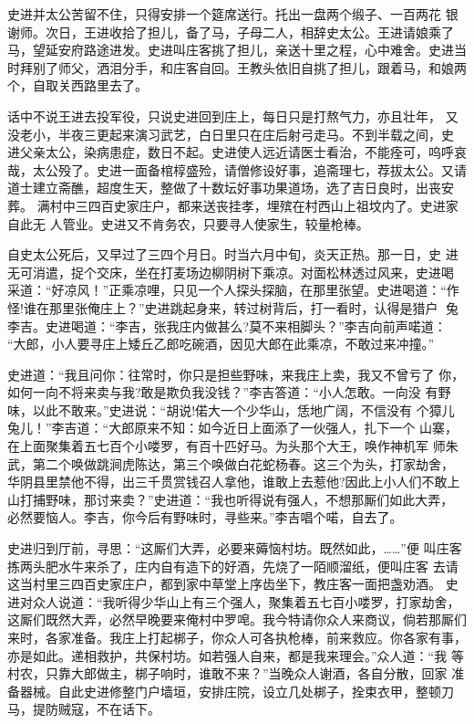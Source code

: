 史进并太公苦留不住，只得安排一个筵席送行。托出一盘两个缎子、一百两花
银谢师。次日，王进收拾了担儿，备了马，子母二人，相辞史太公。王进请娘乘了
马，望延安府路途进发。史进叫庄客挑了担儿，亲送十里之程，心中难舍。史进当
时拜别了师父，洒泪分手，和庄客自回。王教头依旧自挑了担儿，跟着马，和娘两
个，自取关西路里去了。

话中不说王进去投军役，只说史进回到庄上，每日只是打熬气力，亦且壮年，
又没老小，半夜三更起来演习武艺，白日里只在庄后射弓走马。不到半载之间，史
进父亲太公，染病患症，数日不起。史进使人远近请医士看治，不能痊可，呜呼哀
哉，太公殁了。史进一面备棺椁盛殓，请僧修设好事，追斋理七，荐拔太公。又请
道士建立斋醮，超度生天，整做了十数坛好事功果道场，选了吉日良时，出丧安葬。
满村中三四百史家庄户，都来送丧挂孝，埋殡在村西山上祖坟内了。史进家自此无
人管业。史进又不肯务农，只要寻人使家生，较量枪棒。

自史太公死后，又早过了三四个月日。时当六月中旬，炎天正热。那一日，史
进无可消遣，捉个交床，坐在打麦场边柳阴树下乘凉。对面松林透过风来，史进喝
采道：“好凉风！”正乘凉哩，只见一个人探头探脑，在那里张望。史进喝道：“作
怪!谁在那里张俺庄上？”史进跳起身来，转过树背后，打一看时，认得是猎户
兔李吉。史进喝道：“李吉，张我庄内做甚么?莫不来相脚头？”李吉向前声喏道：
“大郎，小人要寻庄上矮丘乙郎吃碗酒，因见大郎在此乘凉，不敢过来冲撞。”

史进道：“我且问你：往常时，你只是担些野味，来我庄上卖，我又不曾亏了
你，如何一向不将来卖与我?敢是欺负我没钱？”李吉答道：“小人怎敢。一向没
有野味，以此不敢来。”史进说：“胡说!偌大一个少华山，恁地广阔，不信没有
个獐儿兔儿！”李吉道：“大郎原来不知：如今近日上面添了一伙强人，扎下一个
山寨，在上面聚集着五七百个小喽罗，有百十匹好马。为头那个大王，唤作神机军
师朱武，第二个唤做跳涧虎陈达，第三个唤做白花蛇杨春。这三个为头，打家劫舍，
华阴县里禁他不得，出三千贯赏钱召人拿他，谁敢上去惹他?因此上小人们不敢上
山打捕野味，那讨来卖？”史进道：“我也听得说有强人，不想那厮们如此大弄，
必然要恼人。李吉，你今后有野味时，寻些来。”李吉唱个喏，自去了。

史进归到厅前，寻思：“这厮们大弄，必要来薅恼村坊。既然如此，……”便
叫庄客拣两头肥水牛来杀了，庄内自有造下的好酒，先烧了一陌顺溜纸，便叫庄客
去请这当村里三四百史家庄户，都到家中草堂上序齿坐下，教庄客一面把盏劝酒。
史进对众人说道：“我听得少华山上有三个强人，聚集着五七百小喽罗，打家劫舍，
这厮们既然大弄，必然早晚要来俺村中罗唣。我今特请你众人来商议，倘若那厮们
来时，各家准备。我庄上打起梆子，你众人可各执枪棒，前来救应。你各家有事，
亦是如此。递相救护，共保村坊。如若强人自来，都是我来理会。”众人道：“我
等村农，只靠大郎做主，梆子响时，谁敢不来？”当晚众人谢酒，各自分散，回家
准备器械。自此史进修整门户墙垣，安排庄院，设立几处梆子，拴束衣甲，整顿刀
马，提防贼寇，不在话下。


